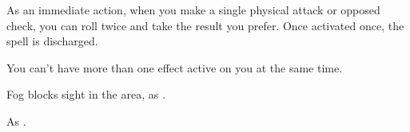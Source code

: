 \begin{spellheader}
    \begin{spelltargetinginfo}
    \end{spelltargetinginfo}
    \begin{spelleffects}
    \end{spelleffects}
\end{spellheader}
\begin{spellcontent}
    \spelleffect As an immediate action, when you make a single physical attack or opposed check, you can roll twice and take the result you prefer. Once activated once, the spell is discharged.
\end{spellcontent}
\begin{spellfooter}
    \spellnotes You can't have more than one  effect active on you at the same time.
\end{spellfooter}

\begin{comment}
\subsubsection{O-P}
\end{comment}

\begin{spellheader}
    \begin{spelltargetinginfo}
    \end{spelltargetinginfo}
    \begin{spelleffects}
    \end{spelleffects}
\end{spellheader}
\begin{spellcontent}
    \spelleffect Fog blocks sight in the area, as .
    \spelldur{\durshort}
\end{spellcontent}
\begin{spellfooter}
    \spellnotes As .
\end{spellfooter}

